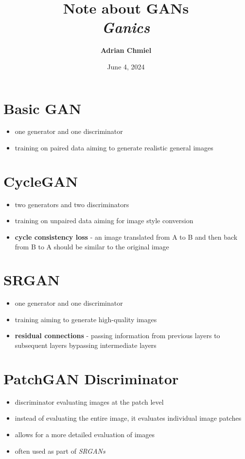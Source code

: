 \documentclass{article}
\begin{document}
\title{\textbf{Note about GANs}
\\ \large{\textit{Ganics}}}
\author{\textbf{Adrian Chmiel}}
\date{June 4, 2024}
\maketitle

\section{Basic GAN}
\begin{itemize}
    \item one generator and one discriminator
    \item training on paired data aiming to generate realistic general images
\end{itemize}

\section{CycleGAN}
\begin{itemize}
    \item two generators and two discriminators
    \item training on unpaired data aiming for image style conversion
    \item \textbf{cycle consistency loss} - an image translated from A to B and then back from B to A should be similar to the original image
\end{itemize}

\section{SRGAN}
\begin{itemize}
    \item one generator and one discriminator
    \item training aiming to generate high-quality images
    \item \textbf{residual connections} - passing information from previous layers to subsequent layers bypassing intermediate layers
\end{itemize}

\section{PatchGAN Discriminator}
\begin{itemize}
    \item discriminator evaluating images at the patch level
    \item instead of evaluating the entire image, it evaluates individual image patches
    \item allows for a more detailed evaluation of images
    \item often used as part of \textit{SRGANs}
\end{itemize}
\end{document}
